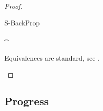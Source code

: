 \documentclass[acmsmall,screen,nonacm,review]{acmart}
\begin{document}
\begin{proof}
\begin{proofcases}
\begin{proofcases}
	    \begin{llproof}
	    \ForallPf{\semenv}{}{}
	    \vdashPf{\semenv\where{\x \is \semenv(\cabsr \tv \tvs \ueqs)}}{\c}{$\x \disjoint \c$}
	    \vdashPf{\semenv}{\cexists {\tv, \tvs} \ueqs}{}
\Hand	    {}
	    \end{llproof}
	\end{proofcases}

  \proofcaserewrite
    {S-BackProp}
    {\C\where
       {\cletr \x \tv \tvs {\Ca\where{\cmatch \tvp \cbrs}}
                           {\Cb\where{\cpapp \x \ren \ueqs \tvc}}} \\
     \tvp \in \dom \ren \\
      {\cunif \t \ueq} \in \C\where\Cb \\
     \x \disjoint \Cb}
    {\C\where{\cletr \x \tv \tvs {\Ca\where{\cmatched \tvp {\shape \t} \cbrs}}
		      {\Cb\where{\cpapp \x \ren \ueqs \tvc}}}}




  \begin{llproof}
    Equivalences are standard, see \citep{Pottier-Remy/emlti}.
  \end{llproof}
  \end{proofcases}
\end{proof}

\subsection{Progress}
\end{document}

